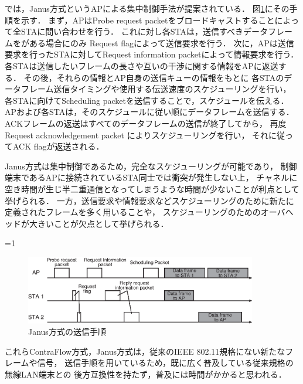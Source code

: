 \documentclass[master]{kuisthesis}		%
\newcounter{flagFig}
\begin{document}
			\par
			\cite{janus}では，Janus方式というAPによる集中制御手法が提案されている．
			図\ref{fig:janus}にその手順を示す．
			まず，APはProbe request packetをブロードキャストすることによって全STAに問い合わせを行う．
			これに対し各STAは，送信すべきデータフレームをがある場合にのみ
			Request flagによって送信要求を行う．
			次に，APは送信要求を行ったSTAに対してRequest information packetによって情報要求を行う．
			各STAは送信したいフレームの長さや互いの干渉に関する情報をAPに返送する．
			その後，それらの情報とAP自身の送信キューの情報をもとに
			各STAのデータフレーム送信タイミングや使用する伝送速度のスケジューリングを行い，
			各STAに向けてScheduling packetを送信することで，スケジュールを伝える．
			APおよび各STAは，そのスケジュールに従い順にデータフレームを送信する．
			ACKフレームの返送はすべてのデータフレームの送信が終了してから，
			再度Request acknowledgement packet によりスケジューリングを行い，
			それに従ってACK flagが返送される．
			\par
			Janus方式は集中制御であるため，完全なスケジューリングが可能であり，
			制御端末であるAPに接続されているSTA同士では衝突が発生しない上，
			チャネルに空き時間が生じ半二重通信となってしまうような時間が少ないことが利点として挙げられる．
			一方，送信要求や情報要求などスケジューリングのために新たに定義されたフレームを多く用いることや，
			スケジューリングのためのオーバヘッドが大きいことが欠点として挙げられる．

			\ifnum\value{flagFig}=1 {\begin{figure}[htbp]
				\begin{center}
					\includegraphics[width=0.9\textwidth]{fig/janus.eps}
					\caption{Janus方式の送信手順}
					\label{fig:janus}
				\end{center}
			\end{figure}}\fi

			\par
			これらContraFlow方式，Janus方式は，従来のIEEE 802.11規格にない新たなフレームや信号，
			送信手順を用いているため，既に広く普及している従来規格の無線LAN端末との
			後方互換性を持たず，普及には時間がかかると思われる．
\end{document}
